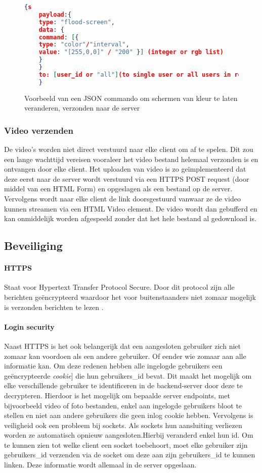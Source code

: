 \begin{figure} [h]
    \begin{lstlisting}[language=json,firstnumber=1]
    {s
    payload:{
    type: "flood-screen",
    data: {
    command: [{
    type: "color"/"interval",
    value: "[255,0,0]" / "200" }] (integer or rgb list)
    }
    }
    to: [user_id or "all"](to single user or all users in room)
    }

    \end{lstlisting}
    \caption{Voorbeeld van een JSON commando om schermen van kleur te laten veranderen, verzonden naar de server} \label{jsonScreenCommand}
\end{figure}

\subsubsection{Video verzenden}
De video's worden niet direct verstuurd naar elke client om af te spelen. Dit zou een lange wachttijd vereisen vooraleer het video bestand helemaal verzonden is en ontvangen door elke client.
Het uploaden van video is zo geïmplementeerd dat deze eerst naar de server wordt verstuurd via een HTTPS POST request (door middel van een HTML Form) en opgeslagen als een bestand op de server. Vervolgens wordt naar elke client de link doorsgestuurd vanwaar ze de video kunnen streamen via een HTML Video element. De video wordt dan gebufferd en kan onmiddelijk worden afgespeeld zonder dat het hele bestand al gedownload is.

\subsection{Beveiliging}
\paragraph{HTTPS} Staat voor Hypertext Transfer Protocol Secure. Door dit protocol zijn alle berichten geëncrypteerd waardoor het voor buitenstaanders niet zomaar mogelijk is verzonden berichten te lezen .
\paragraph{Login security} Naast HTTPS is het ook belangerijk dat een aangesloten gebruiker zich niet zomaar kan voordoen als een andere gebruiker. Of eender wie zomaar aan alle informatie kan. Om deze redenen hebben alle ingelogde gebruikers een geëncrypteerde \textit{cookie}] die hun gebruikers\_id bevat. Dit maakt het mogelijk om elke verschillende gebruiker te identificeren in de backend-server door deze te decrypteren. Hierdoor is het mogelijk om bepaalde server endpoints, met bijvoorbeeld video of foto bestanden, enkel aan ingelogde gebruikers bloot te stellen en niet aan andere gebruikers die geen inlog cookie hebben.
Vervolgens is veiligheid ook een probleem bij sockets. Als sockets hun aansluiting verliezen worden ze automatisch opnieuw aangesloten.Hierbij veranderd enkel hun id. Om te kunnen zien tot welke client een socket toebehoort, moet elke gebruiker zijn gebruikers\_id verzenden via de socket om deze aan zijn gebruikers\_id te kunnen linken. Deze informatie wordt allemaal in de server opgeslaan.

